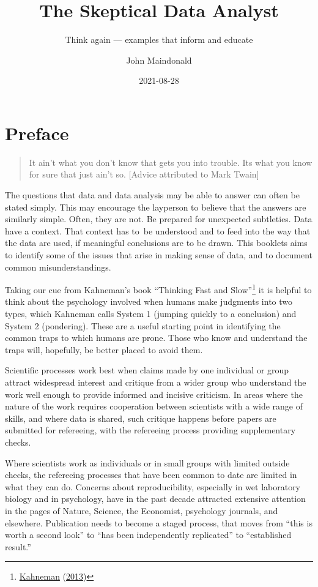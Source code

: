 \documentclass[
  10pt,
  b5paper]{book}
\title{The Skeptical Data Analyst}
\subtitle{Think again --- examples that inform and educate}
\author{John Maindonald}
\date{2021-08-28}
\begin{document}
\maketitle

{
\hypersetup{linkcolor=}
\setcounter{tocdepth}{1}
\tableofcontents
}
\renewcommand{\bibname}{References}

\hypertarget{preface}{%
\chapter*{Preface}\label{preface}}

\begin{quote}
It ain't what you don't know that gets you into trouble.
Its what you know for sure that just ain't so.
{[}Advice attributed to Mark Twain{]}
\end{quote}

The questions that data and data analysis may be able to answer can
often be stated simply. This may encourage the layperson to believe
that the answers are similarly simple. Often, they are not. Be
prepared for unexpected subtleties. Data have a context. That context
has to~be understood and to feed into the way that the data are used,
if meaningful conclusions are to be drawn. This booklets aims to
identify some of the issues that arise in making sense of data,
and to document common misunderstandings.

Taking our cue from Kahneman's book ``Thinking Fast and Slow''\footnote{\protect\hyperlink{ref-kahneman_2013}{Kahneman} (\protect\hyperlink{ref-kahneman_2013}{2013})}
it is helpful to think about the psychology involved when
humans make judgments into two types, which Kahneman calls System 1
(jumping quickly to a conclusion) and System 2 (pondering).
These are a useful starting point in identifying the common traps
to which humans are prone. Those who know and understand the traps
will, hopefully, be better placed to avoid them.

Scientific processes work best when claims made by one individual
or group attract widespread interest and critique from a wider group
who understand the work well enough to provide informed and incisive
criticism. In areas where the nature of the work requires
cooperation between scientists with a wide range of skills, and
where data is shared, such critique happens before papers are
submitted for refereeing, with the refereeing process providing
supplementary checks.

Where scientists work as individuals or in small groups with
limited outside checks, the refereeing processes that have been
common to date are limited in what they can do. Concerns about
reproducibility, especially in wet laboratory biology and in psychology,
have in the past decade attracted extensive attention in the pages of
Nature, Science, the Economist, psychology journals, and elsewhere.
Publication needs to become a staged process, that moves from
``this is worth a second look'' to ``has been independently replicated''
to ``established result.''
\end{document}

